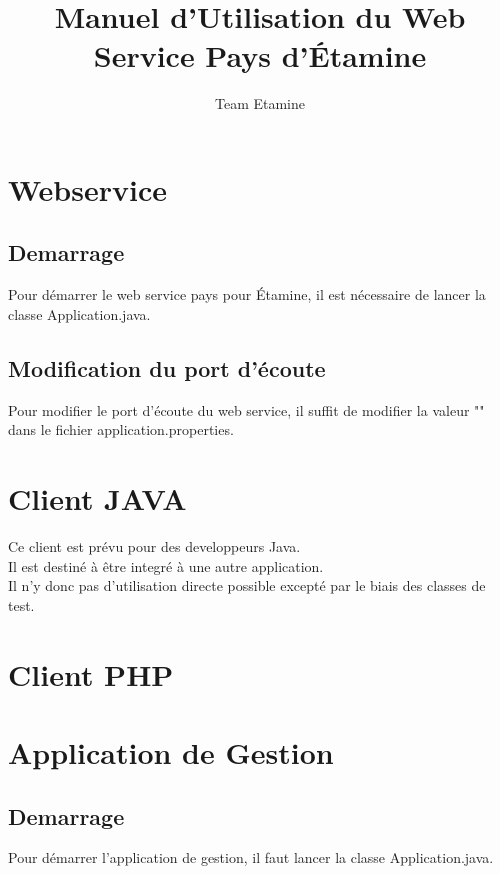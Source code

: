 \documentclass[12pt,a4paper,article]{memoir} %
\title{Manuel d'Utilisation du Web Service Pays d'Étamine}
\author{Team Etamine}
\date{} %
\begin{document}
\maketitle
\break
\tableofcontents %

\chapter{Webservice}

\section{Demarrage}
Pour démarrer le web service pays pour Étamine, il est nécessaire de lancer la classe Application.java.\\

\section{Modification du port d'écoute}
Pour modifier le port d'écoute du web service, il suffit de modifier la valeur "" dans le fichier application.properties.\\

\chapter{Client JAVA}

Ce client est prévu pour des developpeurs Java.\\
Il est destiné à être integré à une autre application.\\
Il n'y donc pas d'utilisation directe possible excepté par le biais des classes de test.\\

\chapter{Client PHP}



\chapter{Application de Gestion}

\section{Demarrage}
Pour démarrer l'application de gestion, il faut lancer la classe Application.java.\\
\end{document}
